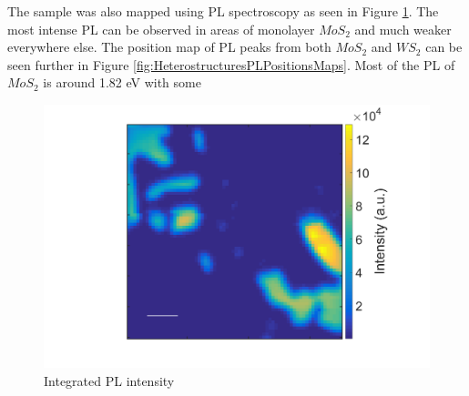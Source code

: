 The sample was also mapped using PL spectroscopy as seen in Figure \ref{fig:HeterostructuresPLIntensityMap11}. The most intense PL can be observed in areas of monolayer $MoS_2$ and much weaker everywhere else. The position map of PL peaks from both $MoS_2$ and $WS_2$ can be seen further in Figure \ref{fig:HeterostructuresPLPositionsMaps}. Most of the PL of $MoS_2$ is around 1.82 eV with some 

\begin{figure}[h]
	\begin{center}
		\includegraphics[scale=0.3]{Heterostructures/PLIntensityMap11.png}
		\caption{Integrated PL intensity}
		\label{fig:HeterostructuresPLIntensityMap11}
	\end{center}
\end{figure}

